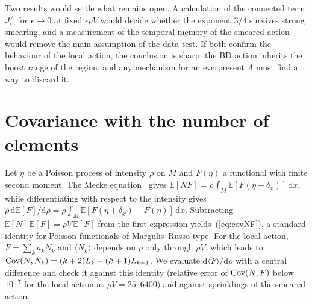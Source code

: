\documentclass{iopjournal}
\newcommand{\eref}[1]{(\ref{#1})}
\newcommand{\rmd}{\mathrm{d}}
\newcommand{\rhoV}{\rho V}
\begin{document}
Two results would settle what remains open. A calculation of the connected
term $J^6_{\rm c}$ for $\epsilon\to0$ at fixed $\epsilon\rhoV$ would decide
whether the exponent $3/4$ survives strong smearing, and a measurement of the
temporal memory of the smeared action would remove the main assumption of the
data test. If both confirm the behaviour of the local action, the conclusion
is sharp: the BD action inherits the boost range of the region, and any
mechanism for an everpresent $\Lambda$ must find a way to discard it.



\appendix

\section{Covariance with the number of elements}
\label{app:mecke}

Let $\eta$ be a Poisson process of intensity $\rho$ on $M$ and $F(\eta)$ a
functional with finite second moment. The Mecke
equation~\cite[theorem~4.1]{LastPenrose2017} gives
$\mathbb{E}[N F]=\rho\int_M\mathbb{E}[F(\eta+\delta_x)]\,\rmd x$, while
differentiating with respect to the intensity gives
$\rho\,\rmd\mathbb{E}[F]/\rmd\rho=\rho\int_M\mathbb{E}[F(\eta+\delta_x)-
F(\eta)]\,\rmd x$. Subtracting $\mathbb{E}[N]\,\mathbb{E}[F]=\rhoV\,
\mathbb{E}[F]$ from the first expression yields~\eref{eq:covNF}, a standard
identity for Poisson functionals of Margulis--Russo type. For the local
action, $F=\sum_ka_kN_k$ and $\langle N_k\rangle$ depends on $\rho$ only through
$\rhoV$, which leads to ${\rm Cov}(N,N_k)=(k+2)L_k-(k+1)L_{k+1}$. We evaluate
$\rmd\langle F\rangle/\rmd\rho$ with a central difference and check it
against this identity (relative error of ${\rm Cov}(N,F)$ below $10^{-7}$ for
the local action at $\rhoV=25$--$6400$) and against sprinklings of the
smeared action.
\end{document}
